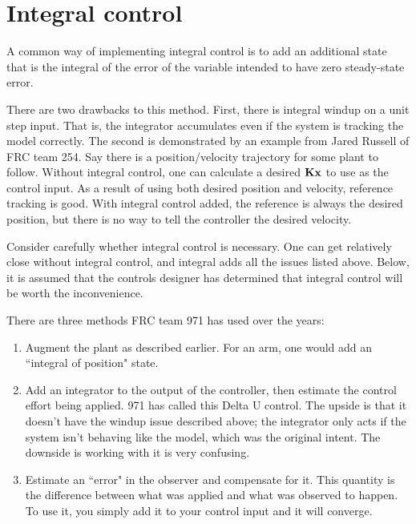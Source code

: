 \section{Integral control}

A common way of implementing integral control is to add an additional
\gls{state} that is the integral of the \gls{error} of the variable intended to
have zero \gls{steady-state error}.

There are two drawbacks to this method. First, there is integral windup on a
unit \gls{step input}. That is, the integrator accumulates even if the
\gls{system} is \gls{tracking} the \gls{model} correctly. The second is
demonstrated by an example from Jared Russell of FRC team 254. Say there is a
position/velocity trajectory for some \gls{plant} to follow. Without integral
control, one can calculate a desired $\mathbf{K}\mathbf{x}$ to use as the
\gls{control input}. As a result of using both desired position and velocity,
\gls{reference} \gls{tracking} is good. With integral control added, the
\gls{reference} is always the desired position, but there is no way to tell the
controller the desired velocity.

Consider carefully whether integral control is necessary. One can get relatively
close without integral control, and integral adds all the issues listed above.
Below, it is assumed that the controls designer has determined that integral
control will be worth the inconvenience.

There are three methods FRC team 971 has used over the years:

\begin{enumerate}
  \item Augment the \gls{plant} as described earlier. For an arm, one would add
    an ``integral of position" state.
  \item Add an integrator to the output of the controller, then estimate the
    \gls{control effort} being applied. 971 has called this Delta U control. The
    upside is that it doesn't have the windup issue described above; the
    integrator only acts if the \gls{system} isn't behaving like the
    \gls{model}, which was the original intent. The downside is working with it
    is very confusing.
  \item Estimate an ``error" in the \gls{observer} and compensate for it. This
    quantity is the difference between what was applied and what was observed to
    happen. To use it, you simply add it to your \gls{control input} and it will
    converge.
\end{enumerate}

